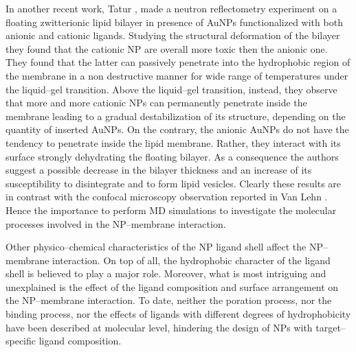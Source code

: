 In another recent work, Tatur \etal \cite{Maccarini2013}, made a neutron reflectometry experiment on a floating zwitterionic lipid bilayer in presence of \acp{AuNP} functionalized with both anionic and cationic ligands. Studying the structural deformation of the bilayer they found that the cationic \acs{NP} are overall more toxic then the anionic one. They found that the latter can passively penetrate into the hydrophobic region of the membrane in a non destructive manner for wide range of temperatures under the liquid--gel transition. Above the liquid--gel transition, instead, they observe that more and more cationic \acp{NP} can permanently penetrate inside the membrane leading to a gradual destabilization of its structure, depending on the quantity of inserted \acp{AuNP}. On the contrary, the anionic \acp{AuNP} do not have the tendency to penetrate inside the lipid membrane. Rather, they interact with its surface strongly dehydrating the floating bilayer. As a consequence the authors suggest a possible decrease in the bilayer thickness and an increase of its susceptibility to disintegrate and to form lipid vesicles. Clearly these results are in contrast with the confocal microscopy observation reported in Van Lehn \etal \cite{VanLehn2013}. Hence the importance to perform \ac{MD} simulations to investigate the molecular processes involved in the \ac{NP}--membrane interaction.

Other physico--chemical characteristics of the \ac{NP} ligand shell affect the \ac{NP}--membrane interaction. On top of all, the hydrophobic character of the ligand shell is believed to play a major role. Moreover, what is most intriguing and unexplained is the effect of the ligand composition and surface arrangement on the \ac{NP}--membrane interaction. To date, neither the poration process, nor the binding process, nor the effects of ligands with different degrees of hydrophobicity have been described at molecular level, hindering the design of \acp{NP} with target--specific ligand composition.


